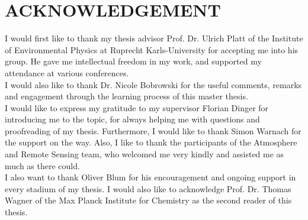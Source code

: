

\chapter*{\centering ACKNOWLEDGEMENT}
I would first like to thank my thesis advisor Prof. Dr. Ulrich Platt of the Institute of Environmental Physics at Ruprecht Karls-University for accepting me into his group.
He gave me intellectual freedom in my work, and supported my attendance at various conferences.\\
I would also like to thank Dr. Nicole Bobrowski for the useful comments, remarks and engagement through the learning process of this master thesis.\\
I would like to express my gratitude to my supervisor Florian Dinger for introducing me to the topic, for always helping me with questions and proofreading of my thesis. Furthermore,  I would like to thank Simon Warnach for the support on the way. Also, I like to thank the participants of the Atmosphere and Remote Sensing team, who welcomed me very kindly and assisted me as much as there could.\\
%
I also want to thank Oliver Blum for his encouragement and ongoing support in every stadium of my thesis.
I would also like to acknowledge Prof. Dr. Thomas Wagner of the Max Planck Institute for Chemistry as the second reader of this thesis.